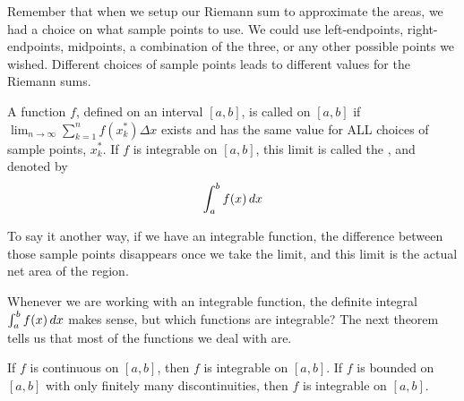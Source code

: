 \documentclass{ximera}
\begin{document}
Remember that when we setup our Riemann sum to approximate the areas, we had a choice on what sample points to use.
We could use left-endpoints, right-endpoints, midpoints, a combination of the three, or any other possible points we wished.
Different choices of sample points leads to different values for the Riemann sums.

\begin{definition}
	A function $f$, defined on an interval $[a,b]$, is called  on $[a,b]$ if
	$\displaystyle \lim_{n\to\infty} \sum_{k=1}^n f(x_k^*) \Delta x$ exists and has the same
	value for ALL choices of sample points, $x_k^*$.  If $f$ is integrable on $[a,b]$, this
	limit is called the , and denoted by
	\[ \int_a^b f(x) \mathop{}\!d x \]
\end{definition}

To say it another way, if we have an integrable function, the difference between those sample points disappears once
we take the limit, and this limit is the actual net area of the region.

Whenever we are working with an integrable function, the definite integral $\int_a^b f(x) \mathop{}\!d x$ makes sense, but which functions are integrable?  The next theorem tells us that most of
the functions we deal with are.
\begin{theorem}
If $f$ is continuous on $[a,b]$, then $f$ is integrable on $[a,b]$.  If $f$ is bounded on $[a,b]$ with only finitely many discontinuities, then $f$ is integrable on $[a,b]$.
\end{theorem}
\end{document}
